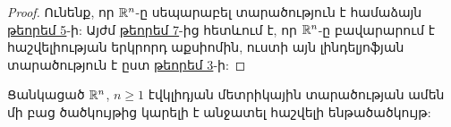 \documentclass[./main.tex]{subfiles}
\begin{document}
\begin{proof}
\par Ունենք, որ $\mathbb{R}^n$-ը սեպարաբել տարածություն է համաձայն \hyperref[ch8thm5]{թեորեմ 5}-ի: Այժմ \hyperref[ch8thm7]{թեորեմ 7}-ից հետևում է, որ $\mathbb{R}^n$-ը բավարարում է հաշվելիության երկրորդ աքսիոմին, ուստի այն լինդելյոֆյան տարածություն է ըստ \hyperref[ch8thm3]{թեորեմ 3}-ի: 
\end{proof}

\begin{hetevanq}\label{ch8cor1}
Ցանկացած $\mathbb{R}^n$, $n \ge 1$ էվկլիդյան մետրիկային տարածության ամեն մի բաց ծածկույթից կարելի է անջատել հաշվելի ենթածածկույթ:
\end{hetevanq}


\end{document}

